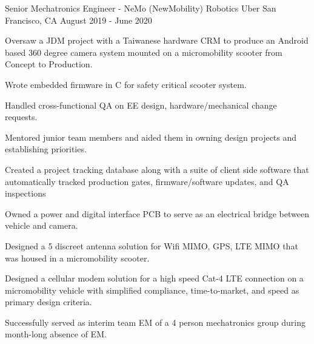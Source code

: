 

\begin{cventries}

  \cventry
    {Senior Mechatronics Engineer - NeMo (NewMobility) Robotics} %
    {Uber} %
    {San Francisco, CA} %
    {August 2019 - June 2020} %
    {
      \begin{cvitems} %
        \item {Oversaw a JDM project with a Taiwanese hardware CRM to produce an Android based 360 degree camera system mounted on a micromobility scooter from Concept to Production.}
        \item {Wrote embedded firmware in C for safety critical scooter system.} 
        \item {Handled cross-functional QA on EE design, hardware/mechanical change requests.}
        \item {Mentored junior team members and aided them in owning design projects and establishing priorities.}
        \item {Created a project tracking database along with a suite of client side software that automatically tracked production gates, firmware/software updates, and QA inspections } 
        \item {Owned a power and digital interface PCB to serve as an electrical bridge between vehicle and camera.}
        \item {Designed a 5 discreet antenna solution for Wifi MIMO, GPS, LTE MIMO that was housed in a micromobility scooter.}
        \item {Designed a cellular modem solution for a high speed Cat-4 LTE connection on a micromobility vehicle with simplified compliance, time-to-market, and speed as primary design criteria.}
        \item {Successfully served as interim team EM of a 4 person mechatronics group during month-long absence of EM.}
      \end{cvitems}
    }


\end{cventries}
